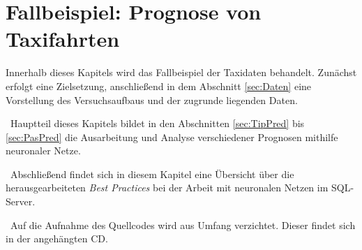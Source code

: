 \chapter{Fallbeispiel: Prognose von Taxifahrten}
\label{cha:Taxis} \label{cha:Experiment}
Innerhalb dieses Kapitels wird das Fallbeispiel der Taxidaten behandelt. Zunächst erfolgt eine Zielsetzung, anschließend in dem Abschnitt \ref{sec:Daten} eine Vorstellung des Versuchsaufbaus und der zugrunde liegenden Daten.

~\newline Hauptteil dieses Kapitels bildet in den Abschnitten \ref{sec:TipPred} bis \ref{sec:PasPred} die Ausarbeitung und Analyse verschiedener Prognosen mithilfe neuronaler Netze.

~\newline Abschließend findet sich in diesem Kapitel eine Übersicht über die herausgearbeiteten \textit{Best Practices} bei der Arbeit mit neuronalen Netzen im SQL-Server.

~\newline Auf die Aufnahme des Quellcodes wird aus Umfang verzichtet. Dieser findet sich in der angehängten CD.




